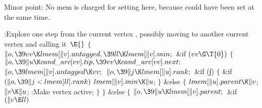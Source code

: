 Minor point: No mem is charged for setting  here,
because  could have been set at the same time.

\Y\B\4:Explore one step from the current vertex , possibly moving
to another current vertex and calling it~\X${}\E{}$\6
${}\{{}$\1\6
${}\|o,\39\\{vv}\K\\{lmem}[\|v].\\{untagged},\39\\{ll}\K\\{lmem}[\|v].%
\\{min};{}$\6
\&{if} ${}(\\{vv}\G\T{0}){}$\5
${}\{{}$\1\6
${}\|o,\39\|u\K\\{cand\_arc}[\\{vv}].\\{tip},\39\\{vv}\K\\{cand\_arc}[\\{vv}].%
\\{next};{}$\6
${}\|o,\39\\{lmem}[\|v].\\{untagged}\K\\{vv};{}$\6
${}\|o,\39\|j\K\\{lmem}[\|u].\\{rank};{}$\6
\&{if} (\|j)\5
${}\{{}$\1\6
\&{if} ${}(\|o,\39\|j<\\{lmem}[\\{ll}].\\{rank}){}$\1\5
${}\\{lmem}[\|v].\\{min}\K\|u{}$;%
\2\6
\4${}\}{}$\5
\2\&{else}\5
${}\{{}$\1\6
${}\\{lmem}[\|u].\\{parent}\K\|v{}$;\6
${}\|v\K\|u{}$;\6
:Make vertex  active\X;\6
\4${}\}{}$\2\6
\4${}\}{}$\5
\2\&{else}\5
${}\{{}$\1\6
${}\|o,\39\|u\K\\{lmem}[\|v].\\{parent};{}$\6
\&{if} ${}(\|v\E\\{ll}){}$\1\5
